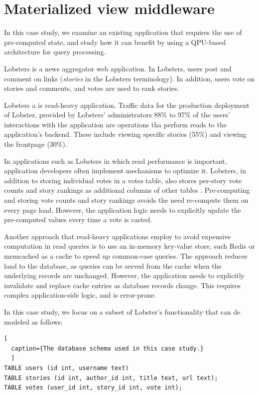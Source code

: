 \section{Materialized view middleware}
\label{sec:lobsters}

In this case study, we examine an existing application that requires the use of pre-computed state,
and study how it can benefit by using a QPU-based architecture for query processing.

Lobsters \cite{lobste:rs} is a news aggregator web application.
In Lobsters, users post and comment on links (\textit{stories} in the Lobsters terminology).
In addition, users vote on stories and comments, and votes are used to rank stories.

Lobsters a is read-heavy application.
Traffic data for the production deployment of Lobster, provided by Lobsters' administrators \cite{lobste:stats} 88\% to 97\%
of the users' interactions with the application are operations tha perform reads to the application's backend.
These include viewing specific stories (55\%) and viewing the frontpage (30\%).

In applications such as Lobsters in which read performance is important, application developers often implement mechanisms to optimize it.
Lobsters, in addition to storing individual votes in a votes table, also stores per-story vote counts and story rankings as additional columns of other tables \cite{lobsters:schema}.
Pre-computing and storing vote counts and story rankings avoids the need re-compute them on every page load.
However, the application logic needs to explicitly update the pre-computed values every time a vote is casted.

Another approach that read-heavy applications employ to avoid expensive computation in read queries
is to use an in-memory key-value store, such Redis or memcached \cite{nishtala:memcachefacebook}
as a cache to speed up common-case queries.
The approach reduces load to the database,
as queries can be served from the cache when the underlying records are unchanged.
However, the application needs to explicitly invalidate and replace cache entries as database records change.
This requires complex application-side logic, and is error-prone.

\bigskip
\noindent
In this case study, we focus on a subset of Lobster's functionality that can de modeled as follows:

\begin{lstlisting}[
  caption={The database schema used in this case study.}
  ]
TABLE users (id int, username text)
TABLE stories (id int, author_id int, title text, url text);
TABLE votes (user_id int, story_id int, vote int);
\end{lstlisting}


